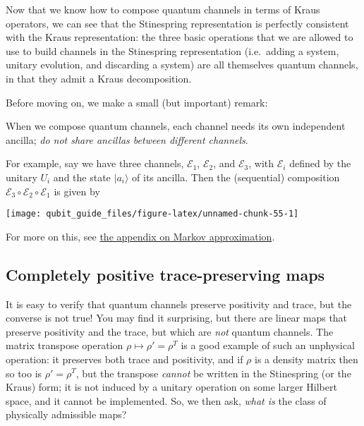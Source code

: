 \documentclass[fleqn]{article}
\newenvironment{idea}{\noindent}{\medskip}
\begin{document}
Now that we know how to compose quantum channels in terms of Kraus operators, we can see that the Stinespring representation is perfectly consistent with the Kraus representation: the three basic operations that we are allowed to use to build channels in the Stinespring representation (i.e.~adding a system, unitary evolution, and discarding a system) are all themselves quantum channels, in that they admit a Kraus decomposition.

Before moving on, we make a small (but important) remark:

\begin{idea}
When we compose quantum channels, each channel needs its own independent ancilla;
\emph{do not share ancillas between different channels}.

\end{idea}

For example, say we have three channels, \(\mathcal{E}_1\), \(\mathcal{E}_2\), and \(\mathcal{E}_3\), with \(\mathcal{E}_i\) defined by the unitary \(U_i\) and the state \(|a_i\rangle\) of its ancilla.
Then the (sequential) composition \(\mathcal{E}_3\circ\mathcal{E}_2\circ\mathcal{E}_1\) is given by

\begin{center}\texttt{[image: qubit\_guide\_files/figure-latex/unnamed-chunk-55-1]} \end{center}

For more on this, see \protect\hyperlink{markov-approximation}{the appendix on Markov approximation}.

\hypertarget{completely-positive-trace-preserving-maps}{%
\subsection{Completely positive trace-preserving maps}\label{completely-positive-trace-preserving-maps}}

It is easy to verify that quantum channels preserve positivity and trace, but the converse is not true!
You may find it surprising, but there are linear maps that preserve positivity and the trace, but which are \emph{not} quantum channels.
The matrix transpose operation \(\rho\mapsto\rho'=\rho^T\) is a good example of such an unphysical operation: it preserves both trace and positivity, and if \(\rho\) is a density matrix then so too is \(\rho'=\rho^T\), but the transpose \emph{cannot} be written in the Stinespring (or the Kraus) form;
it is not induced by a unitary operation on some larger Hilbert space, and it cannot be implemented.
So, we then ask, \emph{what is} the class of physically admissible maps?
\end{document}
